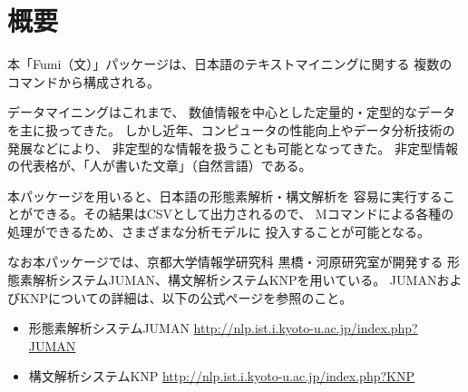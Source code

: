 
\section{概要}

本「Fumi（文）」パッケージは、日本語のテキストマイニングに関する
複数のコマンドから構成される。

データマイニングはこれまで、
数値情報を中心とした定量的・定型的なデータを主に扱ってきた。
しかし近年、コンピュータの性能向上やデータ分析技術の発展などにより、
非定型的な情報を扱うことも可能となってきた。
非定型情報の代表格が、「人が書いた文章」（自然言語）である。

本パッケージを用いると、日本語の形態素解析・構文解析を
容易に実行することができる。その結果はCSVとして出力されるので、
Mコマンドによる各種の処理ができるため、さまざまな分析モデルに
投入することが可能となる。

なお本パッケージでは、京都大学情報学研究科 黒橋・河原研究室が開発する
形態素解析システムJUMAN、構文解析システムKNPを用いている。
JUMANおよびKNPについての詳細は、以下の公式ページを参照のこと。

\begin{itemize}
\item 形態素解析システムJUMAN \url{http://nlp.ist.i.kyoto-u.ac.jp/index.php?JUMAN}
\item 構文解析システムKNP \url{http://nlp.ist.i.kyoto-u.ac.jp/index.php?KNP}
\end{itemize}






